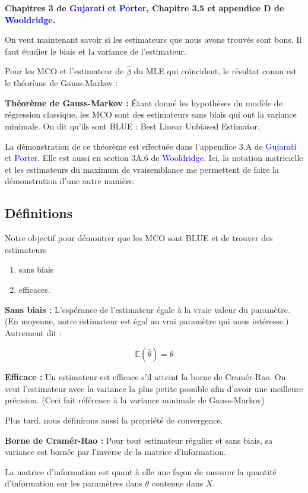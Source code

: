 \documentclass[14pt]{extarticle} %
\newcommand{\livre}[1]{\textcolor{blue}{#1}}
\begin{document}
\textbf{Chapitres 3 de \livre{Gujarati et Porter}, Chapitre 3.5 et appendice D de \livre{Wooldridge}.}

On veut maintenant savoir si les estimateurs que nous avons trouvés sont bons. Il faut étudier le biais et la variance de l’estimateur.

Pour les MCO et l’estimateur de \(\hat{\beta}\) du MLE qui coïncident, le résultat connu est le théorème de Gauss-Markov :

\textbf{Théorème de Gauss-Markov :} Étant donné les hypothèses du modèle de régression classique, les MCO sont des estimateurs sans biais qui ont la variance minimale. On dit qu’ils sont BLUE : Best Linear Unbiased Estimator.

La démonstration de ce théorème est effectuée dans l’appendice 3.A de \livre{Gujarati et Porter}. Elle est aussi en section 3A.6 de \livre{Wooldridge}. Ici, la notation matricielle et les estimateurs du maximum de vraisemblance me permettent de faire la démonstration d’une autre manière.

\subsection{Définitions}

Notre objectif pour démontrer que les MCO sont BLUE et de trouver des estimateurs
\begin{enumerate}
    \item sans biais
    \item efficaces.
\end{enumerate}

\textbf{Sans biais :} L’espérance de l’estimateur égale à la vraie valeur du paramètre. (En moyenne, notre estimateur est égal au vrai paramètre qui nous intéresse.) Autrement dit :

\[
\mathbb{E}(\hat{\theta}) = \theta
\]

\textbf{Efficace :} Un estimateur est efficace s’il atteint la borne de Cramér-Rao. On veut l’estimateur avec la variance la plus petite possible afin d’avoir une meilleure précision. (Ceci fait référence à la variance minimale de Gauss-Markov)

Plus tard, nous définirons aussi la propriété de convergence.

\textbf{Borne de Cramér-Rao :} Pour tout estimateur régulier et sans biais, sa variance est bornée par l’inverse de la matrice d’information.

La matrice d’information est quant à elle une façon de mesurer la quantité d’information sur les paramètres dans \(\theta\) contenue dans \(X\).
\end{document}
